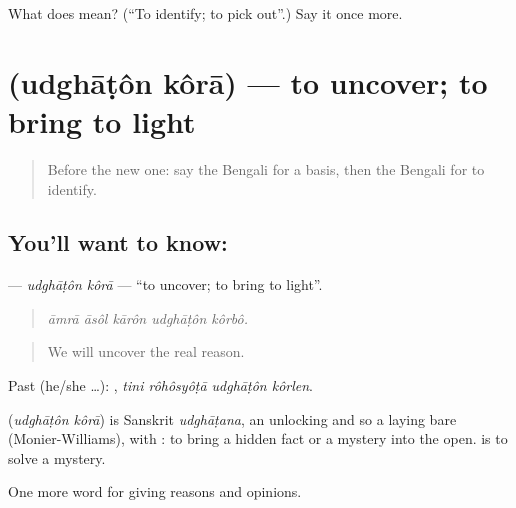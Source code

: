 \begin{tcolorbox}[breakable,colback=teal!4,colframe=teal!35!black,title={Before you move on}]
What does   mean? (\textquotedblleft{}To identify; to pick out\textquotedblright{}.) Say it once more.
\end{tcolorbox}
\section[\texorpdfstring{\bn{উদ্ঘাটন} \bn{করা} (udghāṭôn kôrā)}{উদ্ঘাটন করা (udghāṭôn kôrā)}]{  (udghāṭôn kôrā) — to uncover; to bring to light}

\label{lesson:BN-C337-udghaton-kora}



\begin{quote}
Before the new one: say the Bengali for a basis, then the Bengali for to identify.
\end{quote}

\subsection*{You'll want to know:  }
\textbf{ } — \emph{udghāṭôn kôrā} — \textquotedblleft{}to uncover; to bring to light\textquotedblright{}.

\begin{quote}
    
\end{quote}

\begin{quote}
\emph{āmrā āsôl kārôn udghāṭôn kôrbô.}
\end{quote}

\begin{quote}
We will uncover the real reason.
\end{quote}

Past (he/she …):    , \emph{tini rôhôsyôṭā udghāṭôn kôrlen}.

\begin{cousinweb}
\textbf{ } (\emph{udghāṭôn kôrā}) is Sanskrit \emph{udghāṭana}, an unlocking and so a laying bare (Monier-Williams), with : to bring a hidden fact or a mystery into the open.    is to solve a mystery.
\end{cousinweb}

\begin{grammarlens}[title={What you've built}]
One more word for giving reasons and opinions.
\end{grammarlens}

